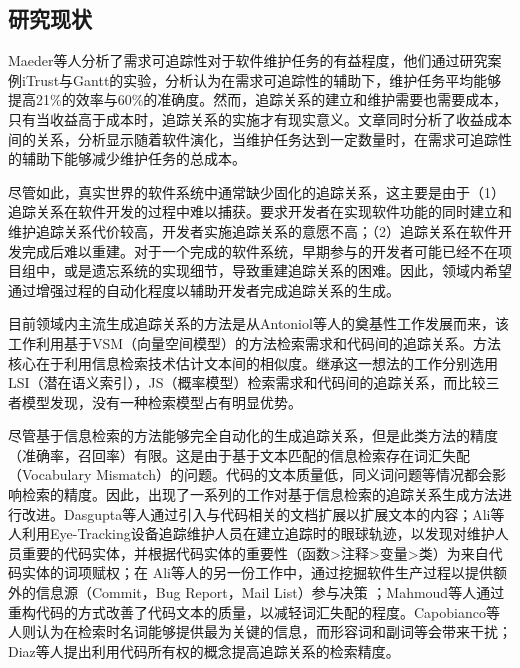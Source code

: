 \subsection{研究现状}

Maeder等人\cite{mader2012assessing}分析了需求可追踪性对于软件维护任务的有益程度，他们通过研究案例iTrust与Gantt的实验，分析认为在需求可追踪性的辅助下，维护任务平均能够提高21\%的效率与60\%的准确度。然而，追踪关系的建立和维护需要也需要成本，只有当收益高于成本时，追踪关系的实施才有现实意义。文章\cite{mader2012assessing}同时分析了收益成本间的关系，分析显示随着软件演化，当维护任务达到一定数量时，在需求可追踪性的辅助下能够减少维护任务的总成本。

尽管如此，真实世界的软件系统中通常缺少固化的追踪关系\cite{ramesh1995implementing}，这主要是由于（1）追踪关系在软件开发的过程中难以捕获。要求开发者在实现软件功能的同时建立和维护追踪关系代价较高，开发者实施追踪关系的意愿不高；（2）追踪关系在软件开发完成后难以重建。对于一个完成的软件系统，早期参与的开发者可能已经不在项目组中，或是遗忘系统的实现细节，导致重建追踪关系的困难。因此，领域内希望通过增强过程的自动化程度以辅助开发者完成追踪关系的生成。

目前领域内主流生成追踪关系的方法是从Antoniol等人\cite{antoniol2002recovering}的奠基性工作发展而来，该工作利用基于VSM（向量空间模型）的方法检索需求和代码间的追踪关系。方法核心在于利用信息检索技术估计文本间的相似度。继承这一想法的工作\cite{marcus2003recovering,cleland2005utilizing}分别选用LSI（潜在语义索引），JS（概率模型）检索需求和代码间的追踪关系，而比较三者模型发现，没有一种检索模型占有明显优势\cite{abadi2008traceability,eaddy2008cerberus}。

尽管基于信息检索的方法能够完全自动化的生成追踪关系，但是此类方法的精度（准确率，召回率）有限。这是由于基于文本匹配的信息检索存在词汇失配（Vocabulary Mismatch）的问题。代码的文本质量低，同义词问题等情况都会影响检索的精度。因此，出现了一系列的工作对基于信息检索的追踪关系生成方法进行改进。Dasgupta等人\cite{dasgupta2013enhancing}通过引入与代码相关的文档扩展以扩展文本的内容；Ali等人\cite{ali2012empirical}利用Eye-Tracking设备追踪维护人员在建立追踪时的眼球轨迹，以发现对维护人员重要的代码实体，并根据代码实体的重要性（函数>注释>变量>类）为来自代码实体的词项赋权；在 Ali等人\cite{ali2013trustrace}的另一份工作中，通过挖掘软件生产过程以提供额外的信息源（Commit，Bug Report，Mail List）参与决策
；Mahmoud\cite{mahmoud2013supporting}等人通过重构代码的方式改善了代码文本的质量，以减轻词汇失配的程度。Capobianco\cite{capobianco2013improving}等人则认为在检索时名词能够提供最为关键的信息，而形容词和副词等会带来干扰；Diaz等人\cite{diaz2013using}提出利用代码所有权的概念提高追踪关系的检索精度。


